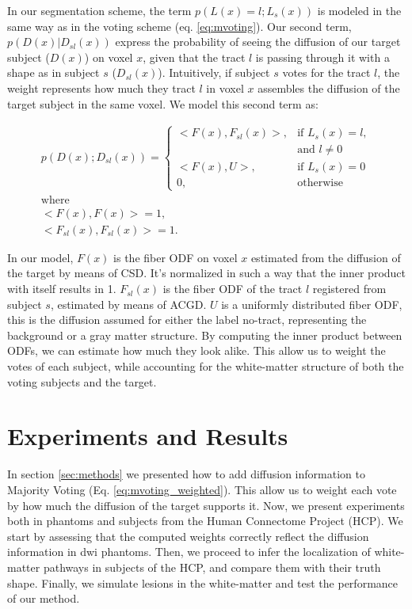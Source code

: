 In our segmentation scheme, the term $p(L(x) = l ; L_s(x))$ is modeled in the same
way as in the voting scheme (eq. \ref{eq:mvoting}). Our second term,
$p(D(x) | D_{sl}(x))$ express the probability of seeing the diffusion of our
target subject ($D(x)$) on voxel $x$, given that the tract $l$ is passing through
it with a shape as in subject $s$ ($D_{sl}(x)$). Intuitively, if subject $s$ votes
for the tract $l$, the weight represents how much they tract $l$ in voxel $x$
assembles the diffusion of the target subject in the same voxel. We model this
second term as:

\begin{equation}
\label{eq:inner_odf}
\begin{aligned}
    p(D(x) ; D_{sl}(x)) = 
    \begin{cases}
        <F(x), F_{sl}(x)>,& \text{if } L_s(x) = l,\\
                        & \text{and } l \neq 0 \\
        <F(x), U>,& \text{if } L_s(x) = 0 \\
        0,& \text{otherwise}
    \end{cases} \\
    \text{where} \\
    <F(x),F(x)> = 1,\\ < F_{sl}(x), F_{sl}(x)>=1.
\end{aligned}
\end{equation}

In our model, $F(x)$ is the fiber ODF on voxel $x$ estimated from the diffusion
of the target by means of CSD. It's normalized in such a way that the inner
product with itself results in 1. $F_{sl}(x)$ is the fiber ODF of the tract $l$
registered from subject $s$, estimated by means of ACGD. $U$ is a uniformly
distributed fiber ODF, this is the diffusion assumed for either the label 
no-tract, representing the background or a gray matter structure.
By computing the inner product between ODFs, we can estimate how much they look
alike. This allow us to weight the votes of each subject, while accounting for
the white-matter structure of both the voting subjects and the target.

\section{Experiments and Results}

In section \ref{sec:methods} we presented how to add diffusion information to
Majority Voting (Eq. \ref{eq:mvoting_weighted}). This allow us to weight each
vote by how much the diffusion of the target supports it. Now, we present
experiments both in phantoms and subjects from the Human Connectome 
Project (HCP). We start by assessing that the computed weights correctly reflect
the diffusion information in dwi phantoms. Then, we proceed to infer the localization
of white-matter pathways in subjects of the HCP, and compare them with their
truth shape. Finally, we simulate lesions in the white-matter and test the
performance of our method.

